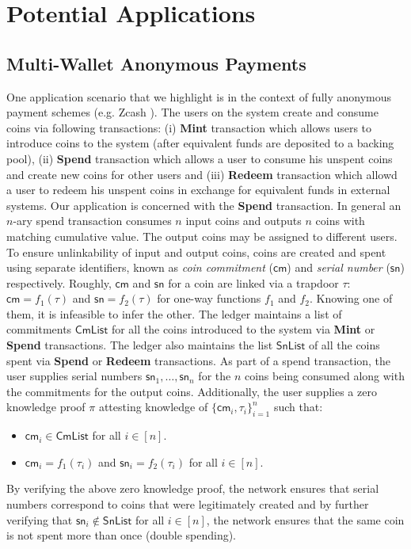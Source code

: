 \section{Potential Applications}
\subsection{Multi-Wallet Anonymous Payments}
One application scenario that we highlight is in the context of fully anonymous payment schemes (e.g. Zcash \cite{zerocash}). The users on the system
create and consume coins via following transactions: (i) {\bf Mint} transaction which allows users to introduce coins to the system (after equivalent funds are
deposited to a backing pool), (ii) {\bf Spend} transaction which allows a user to consume his unspent coins and create new coins for other users and 
(iii) {\bf Redeem} transaction which allowd a user to redeem his unspent coins in exchange for equivalent funds in external systems. Our application 
is concerned with the {\bf Spend} transaction. In general an $n$-ary spend transaction consumes $n$ input coins and outputs $n$ coins with matching 
cumulative value. The output coins may be assigned to different users. To ensure unlinkability of input and output coins, coins are created
and spent using separate identifiers, known as {\em coin commitment} ($\mathsf{cm}$) and {\em serial number} ($\mathsf{sn}$) respectively. 
Roughly, $\mathsf{cm}$
and $\mathsf{sn}$ for a coin are linked via a trapdoor $\tau$: $\mathsf{cm} = f_1(\tau)$ and $\mathsf{sn}=f_2(\tau)$ for one-way functions
$f_1$ and $f_2$. Knowing one of them, it is infeasible to infer the other.  
The ledger maintains a list of commitments $\mathsf{CmList}$ for all the coins introduced to the system via {\bf Mint} or {\bf Spend} transactions. 
The ledger also maintains the list $\mathsf{SnList}$ of all the coins spent via {\bf Spend} or {\bf Redeem} transactions. As part of a spend transaction, 
the user supplies serial numbers $\mathsf{sn}_1,\ldots,\mathsf{sn}_n$ for the $n$ coins being consumed along with the commitments for the output coins.
 Additionally, the 
user supplies a zero knowledge proof $\pi$ attesting knowledge of $\{\mathsf{cm}_i,\tau_i\}_{i=1}^n$ such that:
\begin{itemize}
    \item $\mathsf{cm}_i\in \mathsf{CmList}$ for all $i\in [n]$.
    \item $\mathsf{cm}_i=f_1(\tau_i)$ and $\mathsf{sn}_i=f_2(\tau_i)$ for all $i\in [n]$.
\end{itemize}
By verifying the above zero knowledge proof, the network ensures that serial numbers correspond to coins that were legitimately created and by further
verifying that $\mathsf{sn}_i\not\in \mathsf{SnList}$ for all $i\in [n]$, the network ensures that the same coin is not 
spent more than once (double spending).

